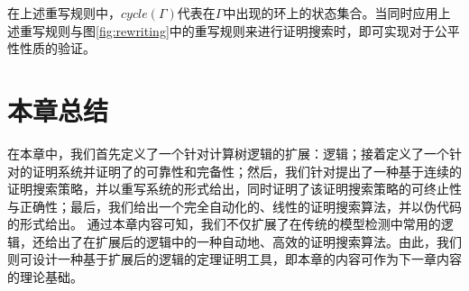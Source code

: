 \begin{center}
\begin{tabular}{|ll|}
	\end{tabular}
\end{center}
在上述重写规则中，$cycle(\Gamma)$代表在$\Gamma$中出现的环上的状态集合。当同时应用上述重写规则与图\ref{fig:rewriting}中的重写规则来进行证明搜索时，即可实现对于公平性性质的验证。


\section{本章总结}
在本章中，我们首先定义了一个针对计算树逻辑\CTL{}的扩展：\CTLP{}逻辑；接着定义了一个针对\CTLP{}的证明系统\SCTL{}并证明了\SCTL{}的可靠性和完备性；然后，我们针对\SCTL{}提出了一种基于连续的证明搜索策略，并以重写系统的形式给出，同时证明了该证明搜索策略的可终止性与正确性；最后，我们给出一个完全自动化的、线性的证明搜索算法，并以伪代码的形式给出。
通过本章内容可知，我们不仅扩展了在传统的模型检测中常用的\CTL{}逻辑，还给出了在扩展后的逻辑中的一种自动地、高效的证明搜索算法。由此，我们则可设计一种基于扩展后的逻辑的定理证明工具，即本章的内容可作为下一章内容的理论基础。




